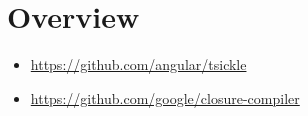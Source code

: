 \section{Overview}



\begin{itemize}
  \item \url{https://github.com/angular/tsickle}
\end{itemize}




\begin{itemize}
  \item \url{https://github.com/google/closure-compiler}
\end{itemize}

